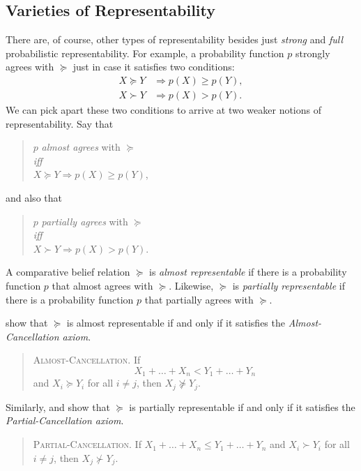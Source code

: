 \subsection{Varieties of Representability}

There are, of course, other types of representability besides just \textit{strong} and \textit{full} probabilistic representability. For example, a probability function $p$ strongly agrees with $\succeq$ just in case it satisfies two conditions:
$$
\begin{aligned}
X\succeq Y &\Rightarrow p(X)\geq p(Y),\\
X \succ Y  &\Rightarrow p(X)>p(Y).
\end{aligned}
$$
We can pick apart these two conditions to arrive at two weaker notions of representability. Say that
\begin{quote}\centering
$p$ \emph{almost agrees} with $\succeq$\\
\emph{iff}\\
$X\succeq Y \Rightarrow p(X)\geq p(Y)$,
\end{quote}
and also that
\begin{quote}\centering
$p$ \emph{partially agrees} with $\succeq$\\
\emph{iff}\\
$X\succ Y \Rightarrow p(X)> p(Y)$.
\end{quote}
A comparative belief relation $\succeq$ is \emph{almost representable} if there is a probability function $p$ that almost agrees with $\succeq$. Likewise, $\succeq$ is \emph{partially representable} if there is a probability function $p$ that partially agrees with $\succeq$. 

\citet{Kraft1959} show that $\succeq$ is almost representable if and only if it satisfies the \textit{Almost-Cancellation axiom}.
\begin{quote}
\textsc{Almost-Cancellation}. If
$$ X_1+\ldots+X_n<Y_1+\ldots+Y_n $$
and $X_i\succeq Y_i$ for all $i\not=j$, then $X_j\not\succeq Y_j$.
\end{quote}

Similarly, \citet{Adams1965} and \citet{Fishburn1969} show that $\succeq$ is partially representable if and only if it satisfies the \textit{Partial-Cancellation axiom}.
\begin{quote}
\textsc{Partial-Cancellation}.  If $ X_1+\ldots+X_n\leq Y_1+\ldots+Y_n $ and $X_i\succ Y_i$ for all $i\not=j$, then $X_j\not\succ Y_j$.
\end{quote}

